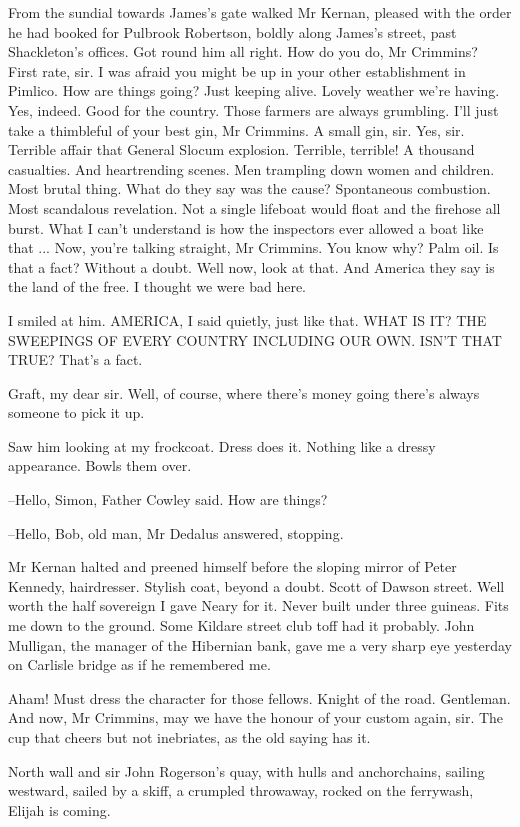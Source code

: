 From the sundial towards James's gate walked Mr Kernan, pleased with the
order he had booked for Pulbrook Robertson, boldly along James's street,
past Shackleton's offices. Got round him all right. How do you do, Mr
Crimmins? First rate, sir. I was afraid you might be up in your other
establishment in Pimlico. How are things going? Just keeping alive.
Lovely weather we're having. Yes, indeed. Good for the country. Those
farmers are always grumbling. I'll just take a thimbleful of your best
gin, Mr Crimmins. A small gin, sir. Yes, sir. Terrible affair that
General Slocum explosion. Terrible, terrible! A thousand casualties. And
heartrending scenes. Men trampling down women and children. Most brutal
thing. What do they say was the cause? Spontaneous combustion. Most
scandalous revelation. Not a single lifeboat would float and the firehose
all burst. What I can't understand is how the inspectors ever allowed a
boat like that ... Now, you're talking straight, Mr Crimmins. You know
why? Palm oil. Is that a fact? Without a doubt. Well now, look at that.
And America they say is the land of the free. I thought we were bad here.

I smiled at him. AMERICA, I said quietly, just like that. WHAT IS IT? THE
SWEEPINGS OF EVERY COUNTRY INCLUDING OUR OWN. ISN'T THAT TRUE? That's a
fact.

Graft, my dear sir. Well, of course, where there's money going there's
always someone to pick it up.

Saw him looking at my frockcoat. Dress does it. Nothing like a dressy
appearance. Bowls them over.

--Hello, Simon, Father Cowley said. How are things?

--Hello, Bob, old man, Mr Dedalus answered, stopping.

Mr Kernan halted and preened himself before the sloping mirror of Peter
Kennedy, hairdresser. Stylish coat, beyond a doubt. Scott of Dawson
street. Well worth the half sovereign I gave Neary for it. Never built
under three guineas. Fits me down to the ground. Some Kildare street club
toff had it probably. John Mulligan, the manager of the Hibernian bank,
gave me a very sharp eye yesterday on Carlisle bridge as if he remembered
me.

Aham! Must dress the character for those fellows. Knight of the road.
Gentleman. And now, Mr Crimmins, may we have the honour of your custom
again, sir. The cup that cheers but not inebriates, as the old saying has
it.

North wall and sir John Rogerson's quay, with hulls and anchorchains,
sailing westward, sailed by a skiff, a crumpled throwaway, rocked on the
ferrywash, Elijah is coming.

